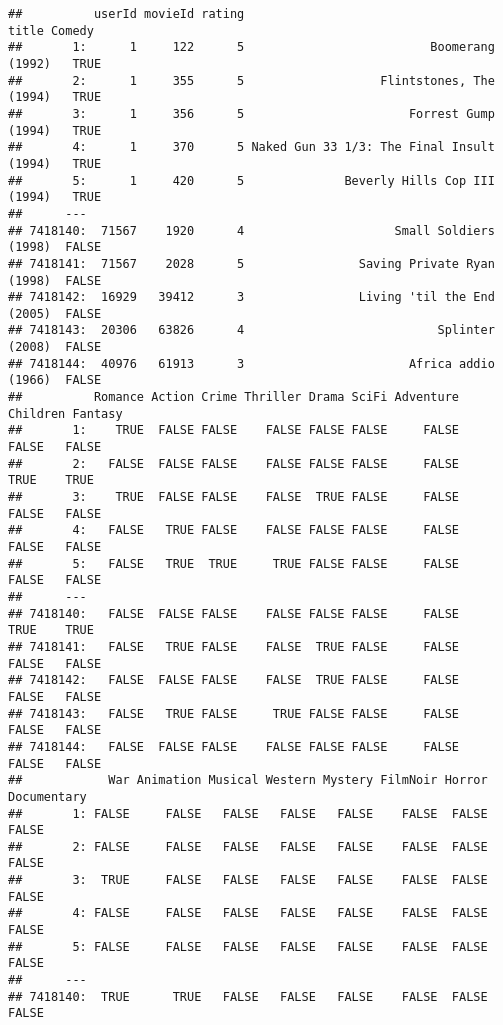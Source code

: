 \documentclass[
]{article}
\begin{document}
\begin{verbatim}
##          userId movieId rating                                     title Comedy
##       1:      1     122      5                          Boomerang (1992)   TRUE
##       2:      1     355      5                   Flintstones, The (1994)   TRUE
##       3:      1     356      5                       Forrest Gump (1994)   TRUE
##       4:      1     370      5 Naked Gun 33 1/3: The Final Insult (1994)   TRUE
##       5:      1     420      5              Beverly Hills Cop III (1994)   TRUE
##      ---                                                                       
## 7418140:  71567    1920      4                     Small Soldiers (1998)  FALSE
## 7418141:  71567    2028      5                Saving Private Ryan (1998)  FALSE
## 7418142:  16929   39412      3                Living 'til the End (2005)  FALSE
## 7418143:  20306   63826      4                           Splinter (2008)  FALSE
## 7418144:  40976   61913      3                       Africa addio (1966)  FALSE
##          Romance Action Crime Thriller Drama SciFi Adventure Children Fantasy
##       1:    TRUE  FALSE FALSE    FALSE FALSE FALSE     FALSE    FALSE   FALSE
##       2:   FALSE  FALSE FALSE    FALSE FALSE FALSE     FALSE     TRUE    TRUE
##       3:    TRUE  FALSE FALSE    FALSE  TRUE FALSE     FALSE    FALSE   FALSE
##       4:   FALSE   TRUE FALSE    FALSE FALSE FALSE     FALSE    FALSE   FALSE
##       5:   FALSE   TRUE  TRUE     TRUE FALSE FALSE     FALSE    FALSE   FALSE
##      ---                                                                     
## 7418140:   FALSE  FALSE FALSE    FALSE FALSE FALSE     FALSE     TRUE    TRUE
## 7418141:   FALSE   TRUE FALSE    FALSE  TRUE FALSE     FALSE    FALSE   FALSE
## 7418142:   FALSE  FALSE FALSE    FALSE  TRUE FALSE     FALSE    FALSE   FALSE
## 7418143:   FALSE   TRUE FALSE     TRUE FALSE FALSE     FALSE    FALSE   FALSE
## 7418144:   FALSE  FALSE FALSE    FALSE FALSE FALSE     FALSE    FALSE   FALSE
##            War Animation Musical Western Mystery FilmNoir Horror Documentary
##       1: FALSE     FALSE   FALSE   FALSE   FALSE    FALSE  FALSE       FALSE
##       2: FALSE     FALSE   FALSE   FALSE   FALSE    FALSE  FALSE       FALSE
##       3:  TRUE     FALSE   FALSE   FALSE   FALSE    FALSE  FALSE       FALSE
##       4: FALSE     FALSE   FALSE   FALSE   FALSE    FALSE  FALSE       FALSE
##       5: FALSE     FALSE   FALSE   FALSE   FALSE    FALSE  FALSE       FALSE
##      ---                                                                    
## 7418140:  TRUE      TRUE   FALSE   FALSE   FALSE    FALSE  FALSE       FALSE

\end{verbatim}
\end{document}
